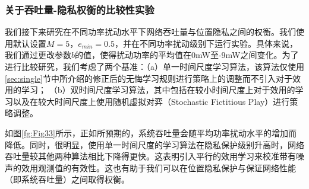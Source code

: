 \subsubsection{关于吞吐量-隐私权衡的比较性实验}
我们接下来研究在不同功率扰动水平下网络吞吐量与位置隐私之间的权衡。我们使用默认设置$M = 5$，$e_ {min} = 0.5$，并在不同功率扰动级别下运行实验。具体来说，我们通过更改参数$b$的值，使得扰动功率的平均值在0mW至-9mW之间变化。为了进行比较研究，我们考虑了两个基准：（a）单一时间尺度学习算法，该算法仅使用\ref{sec:single}节中所介绍的修正后的无悔学习规则进行策略上的调整而不引入对于效用的学习； （b）双时间尺度学习算法，其中包括在较小时间尺度上对于效用的学习以及在较大时间尺度上使用随机虚拟对弈（Stochastic Fictitious Play）\cite{ZhangGlobe}进行策略调整。


如图\ref{fg:Fig33}所示，正如所预期的，系统吞吐量会随平均功率扰动水平的增加而降低。同时，很明显，使用单一时间尺度的学习算法在隐私保护级别升高时，网络吞吐量较其他两种算法相比下降得更快。这表明引入平行的效用学习来校准带有噪声的效用观测值的有效性。这也有助于我们可以在位置隐私保护与保证网络性能（即系统吞吐量）之间取得权衡。

